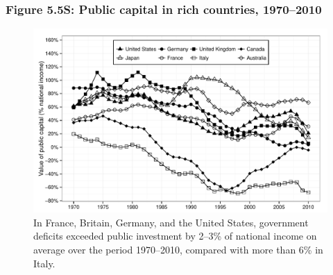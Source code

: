 \documentclass[t]{beamer}\usepackage[]{graphicx}\usepackage[]{color}
\newenvironment{knitrout}{}{} %
\begin{document}
\begin{frame}[label=Figure_5_5S]
\frametitle{Figure 5.5S: Public capital in rich countries, 1970--2010}
\begin{figure}[t]
\begin{minipage}[b]{\textwidth}
\centering
\begin{knitrout}\footnotesize
{}\color{fgcolor}

{\centering \includegraphics[width=1\linewidth]{figures/bw/Figure_5_5S} 

}



\end{knitrout}
\caption{In France, Britain, Germany, and the United States, government deficits exceeded public investment by 2--3\% of national income on average over the period 1970--2010, compared with more than 6\% in Italy.}
\end{minipage}
\end{figure}
\end{frame}
\end{document}
